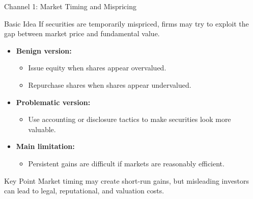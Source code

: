 
\begin{frame}{Channel 1: Market Timing and Mispricing}

\begin{block}{Basic Idea}
If securities are temporarily mispriced, firms may try to exploit the gap
between market price and fundamental value.
\end{block}

\vspace{0.25cm}

\begin{itemize}
    \item \textbf{Benign version:}
    \begin{itemize}
        \item Issue equity when shares appear overvalued.
        \item Repurchase shares when shares appear undervalued.
    \end{itemize}

    \item \textbf{Problematic version:}
    \begin{itemize}
        \item Use accounting or disclosure tactics to make securities look more valuable.
    \end{itemize}

    \item \textbf{Main limitation:}
    \begin{itemize}
        \item Persistent gains are difficult if markets are reasonably efficient.
    \end{itemize}
\end{itemize}

\vfill

\begin{alertblock}{Key Point}
Market timing may create short-run gains, but misleading investors can lead
to legal, reputational, and valuation costs.
\end{alertblock}

\end{frame}

